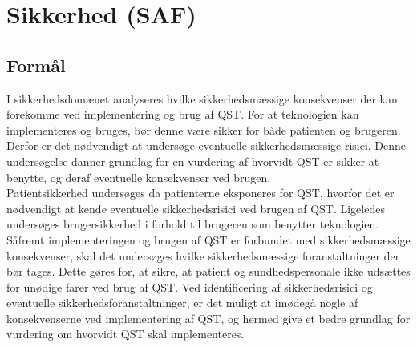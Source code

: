\section{Sikkerhed (SAF)}
\subsection{Formål}
I sikkerhedsdomænet analyseres hvilke sikkerhedsmæssige konsekvenser der kan forekomme ved implementering og brug af QST. For at teknologien kan implementeres og bruges, bør denne være sikker for både patienten og brugeren. Derfor er det nødvendigt at undersøge eventuelle sikkerhedsmæssige risici. Denne undersøgelse danner grundlag for en vurdering af hvorvidt QST er sikker at benytte, og deraf eventuelle konsekvenser ved brugen. \\
Patientsikkerhed undersøges da patienterne eksponeres for QST, hvorfor det er nødvendigt at kende eventuelle sikkerhedsrisici ved brugen af QST. Ligeledes undersøges brugersikkerhed i forhold til brugeren som benytter teknologien. \\
Såfremt  implementeringen og brugen af QST er forbundet med sikkerhedsmæssige konsekvenser, skal det undersøges hvilke sikkerhedsmæssige foranstaltninger der bør tages. Dette gøres for, at sikre, at patient og sundhedspersonale ikke udsættes for unødige farer ved brug af QST. Ved identificering af sikkerhedsrisici og eventuelle sikkerhedsforanstaltninger, er det muligt at imødegå nogle af konsekvenserne ved implementering af QST, og hermed give et bedre grundlag for vurdering om hvorvidt QST skal implementeres.
